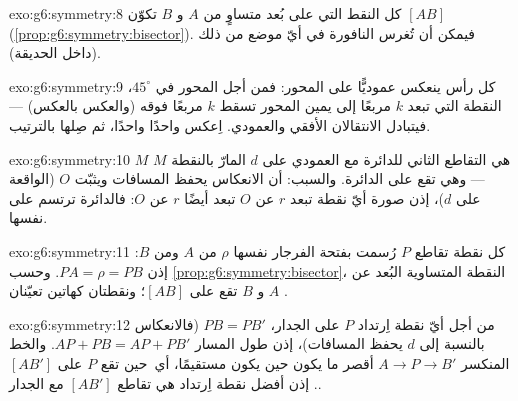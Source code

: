 \begin{solution}{exo:g6:symmetry:8}
كل النقط التي على بُعد متساوٍ من $A$ و $B$ تكوّن
  $[AB]$ (\cref{prop:g6:symmetry:bisector}).
فيمكن أن تُغرس النافورة في أيّ موضع من ذلك  (داخل الحديقة).
\end{solution}

\begin{solution}{exo:g6:symmetry:9}
كل رأس ينعكس عموديًّا على المحور: فمن أجل المحور
في $45^\circ$، النقطة التي تبعد $k$ مربعًا إلى يمين المحور تسقط
$k$ مربعًا فوقه (والعكس بالعكس) --- فيتبادل الانتقالان الأفقي والعمودي.
اِعكس  واحدًا واحدًا، ثم
صِلها بالترتيب.
\end{solution}

\begin{solution}{exo:g6:symmetry:10}
 $M$ هي التقاطع الثاني للدائرة مع
العمودي على $d$ المارّ بالنقطة $M$ --- وهي تقع على الدائرة. والسبب:
أن الانعكاس يحفظ المسافات ويثبّت $O$ (الواقعة على $d$)، إذن
صورة أيّ نقطة تبعد $r$ عن $O$ تبعد أيضًا
$r$ عن $O$: فالدائرة ترتسم على نفسها.
\end{solution}

\begin{solution}{exo:g6:symmetry:11}
كل نقطة تقاطع $P$ رُسمت بفتحة الفرجار نفسها $\rho$
من $A$ ومن $B$: إذن $PA = \rho = PB$. وحسب
\cref{prop:g6:symmetry:bisector}، النقطة المتساوية البُعد عن $A$ و $B$
تقع على   $[AB]$؛ ونقطتان كهاتين تعيّنان
.
\end{solution}

\begin{solution}{exo:g6:symmetry:12}
من أجل أيّ نقطة اِرتداد $P$ على الجدار، $PB = PB'$ (فالانعكاس بالنسبة
إلى $d$ يحفظ المسافات)، إذن طول المسار
$AP + PB = AP + PB'$. والخط المنكسر $A \to P \to B'$ أقصر ما يكون
حين يكون مستقيمًا، أي\ حين تقع $P$ على  $[AB']$. إذن
أفضل نقطة اِرتداد هي تقاطع $[AB']$ مع الجدار.
\end{solution}

